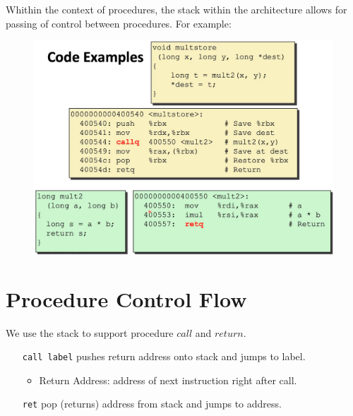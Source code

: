 \documentclass[12pt]{book}
\begin{document}
Whithin the context of procedures, the stack within the architecture allows for passing of control between procedures.
For example:
\begin{figure}[h]
        \centering
        \includegraphics[scale = 0.1]{./figures/procedureCode}
\end{figure}

\section*{Procedure Control Flow}
We use the stack to support procedure $call$ and  $return$.
\begin{itemize}
        \item[\texttt{call label}] pushes return address onto stack and jumps to label.
        \begin{itemize}
                \item Return Address: address of next instruction right after call.
        \end{itemize}
        \item[\texttt{ret}] pop (returns) address from stack and jumps to address.
\end{itemize}
\end{document}
